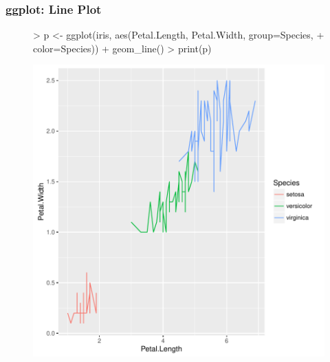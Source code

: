\documentclass{beamer}
\begin{document}
\begin{frame}[containsverbatim]  
	\frametitle{ggplot: Line Plot}
\scriptsize 
\begin{figure}
  \centering
\begin{Schunk}
\begin{Sinput}
> p <- ggplot(iris, aes(Petal.Length, Petal.Width, group=Species, 
+             color=Species)) + geom_line() 
> print(p) 
\end{Sinput}
\end{Schunk}
\includegraphics{fig--048}
\label{fig:qplotscatter}
\end{figure}
\end{frame}
\end{document}
